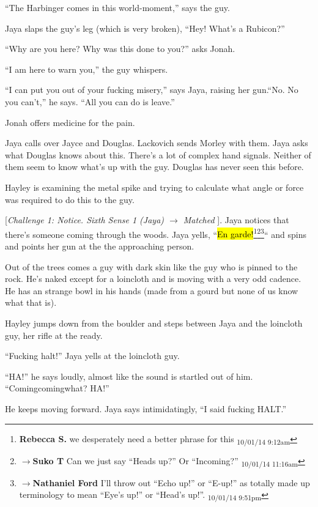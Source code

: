 ``The Harbinger comes in this world-moment,'' says the guy.

Jaya slaps the guy's leg (which is very broken), ``Hey!  What's a Rubicon?''

``Why are you here? Why was this done to you?'' asks Jonah.

``I am here to warn you,'' the guy whispers.

``I can put you out of your fucking misery,'' says Jaya, raising her gun.``No.  No you can't,'' he says.  ``All you can do is leave.''

Jonah offers medicine for the pain.

Jaya calls over Jayce and Douglas.  Lackovich sends Morley with them.  Jaya asks what Douglas knows about this. There's a lot of complex hand signals.  Neither of them seem to know what's up with the guy.  Douglas has never seen this before.

Hayley is examining the metal spike and trying to calculate what angle or force was required to do this to the guy.  



{[}\textit{Challenge 1: Notice.  Sixth Sense 1 (Jaya) $\rightarrow$ Matched }{]}.  Jaya notices that there's someone coming through the woods.  Jaya yells, ``\hl{En garde!}\footnote{\textbf{Rebecca S. }we desperately need a better phrase for this \textsubscript{10/01/14 9:12am}}\footnote{$\rightarrow$\textbf{Suko T }Can we just say ``Heads up?''  Or ``Incoming?'' \textsubscript{10/01/14 11:16am}}\footnote{$\rightarrow$\textbf{Nathaniel Ford }I'll throw out ``Echo up!'' or ``E-up!'' as totally made up terminology to mean ``Eye's up!'' or ``Head's up!''. \textsubscript{10/01/14 9:51pm}}`` and spins and points her gun at the the approaching person.

Out of the trees comes a guy with dark skin like the guy who is pinned to the rock.  He's naked except for a loincloth and is moving with a very odd cadence.  He has an strange bowl in his hands (made from a gourd but none of us know what that is).

Hayley jumps down from the boulder and steps between Jaya and the loincloth guy, her rifle at the ready.

``Fucking halt!'' Jaya yells at the loincloth guy.

``HA!'' he says loudly, almost like the sound is startled out of him.  ``Comingcomingwhat?  HA!''

He keeps moving forward.  Jaya says intimidatingly, ``I said fucking HALT.''

